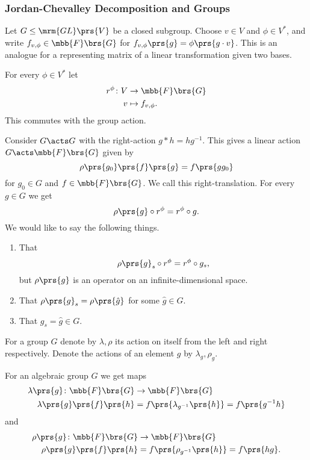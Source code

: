 \documentclass[10pt,a4paper,twoside,openany,hidelinks]{book}
\begin{document}
\subsubsection{Jordan-Chevalley Decomposition and Groups}

Let $G \leq \mrm{GL}\prs{V}$ be a closed subgroup. Choose $v \in V$ and $\phi \in V^*$, and write $f_{v,\phi} \in \mbb{F}\brs{G}$ for $f_{v,\phi}\prs{g} = \phi\prs{g \cdot v}$. This is an analogue for a representing matrix of a linear transformation given two bases.

For every $\phi \in V^*$ let
\begin{align*}
r^\phi \colon V &\to \mbb{F}\brs{G} \\
v &\mapsto f_{v,\phi} \text{.}
\end{align*}
This commutes with the group action.

Consider $G \acts G$ with the right-action $g * h = h g^{-1}$. This gives a linear action $G \acts \mbb{F}\brs{G}$ given by
\[\rho\prs{g_0}\prs{f}\prs{g} = f\prs{g g_0}\]
for $g_0 \in G$ and $f \in \mbb{F}\brs{G}$. We call this right-translation.
For every $g \in G$ we get
\[\rho\prs{g} \circ r^{\phi} = r^\phi \circ g \text{.}\]
We would like to say the following things.

\begin{enumerate}
\item That
\[\rho\prs{g}_s \circ r^\phi = r^\phi \circ g_s \text{,}\]
but $\rho\prs{g}$ is an operator on an infinite-dimensional space.
\item That $\rho\prs{g}_s = \rho\prs{\hat{g}}$ for some $\hat{g} \in G$.
\item That $g_s = \hat{g} \in G$.
\end{enumerate}


\begin{notation}
For a group $G$ denote by $\lambda, \rho$ its action on itself from the left and right respectively. Denote the actions of an element $g$ by $\lambda_g, \rho_g$.
\end{notation}

\begin{remark}
For an algebraic group $G$ we get maps
\begin{align*}
\lambda\prs{g} \colon \mbb{F}\brs{G} &\to \mbb{F}\brs{G} \\
\lambda\prs{g}\prs{f}\prs{h} &= f\prs{\lambda_{g^{-1}}\prs{h}} = f\prs{g^{-1} h}
\end{align*}
and
\begin{align*}
\rho\prs{g} \colon \mbb{F}\brs{G} &\to \mbb{F}\brs{G} \\
\rho\prs{g}\prs{f}\prs{h} &= f\prs{\rho_{g^{-1}}\prs{h}} = f\prs{hg} \text{.}
\end{align*}
\end{remark}
\end{document}
